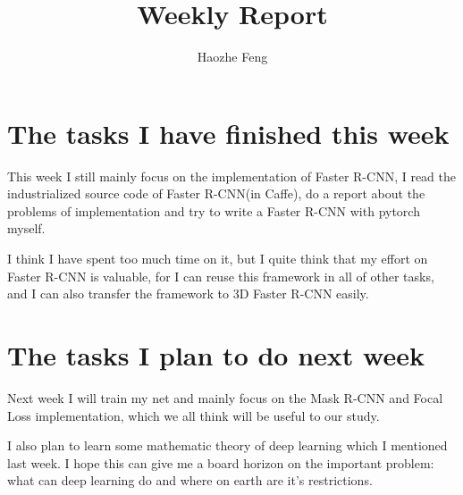 \documentclass{article}
\title{Weekly Report}
\author{Haozhe Feng}
\begin{document}
	\maketitle{}
\section{The tasks I have finished this week}
This week I still mainly focus on the implementation of Faster R-CNN, I read the industrialized source code of Faster R-CNN(in Caffe), do a report about the problems of implementation and try to write a Faster R-CNN with pytorch myself.\\
\vspace*{.3cm}

\noindent I think I have spent too much time on it, but I quite think that my effort on Faster R-CNN is valuable, for I can reuse this framework in all of other tasks, and I can also transfer the framework to 3D Faster R-CNN easily.\\

\section{The tasks I plan to do next week}
Next week I will train my net and mainly focus on the Mask R-CNN and Focal Loss implementation, which we all think will be useful to our study.\\
\vspace*{.3cm}

\noindent I also plan to learn some mathematic theory of deep learning which I mentioned last week. I hope this can give me a board horizon on the important problem: what can deep learning do and where on earth are it's restrictions. 
\end{document}
